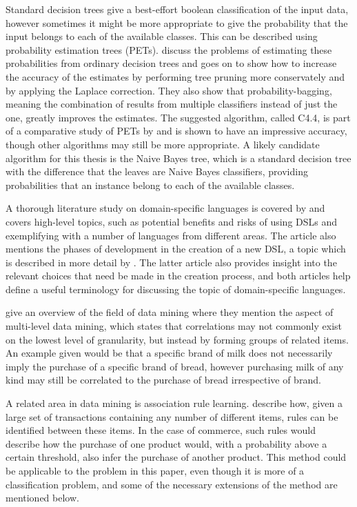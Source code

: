 \documentclass[a4paper]{article}
\begin{document}
Standard decision trees give a best-effort boolean classification of the input data, however sometimes it might be more appropriate to give the probability that the input belongs to each of the available classes. This can be described using probability estimation trees (PETs). \citet{Provost2003} discuss the problems of estimating these probabilities from ordinary decision trees and goes on to show how to increase the accuracy of the estimates by performing tree pruning more conservately and by applying the Laplace correction.  They also show that probability-bagging, meaning the combination of results from multiple classifiers instead of just the one, greatly improves the estimates. The suggested algorithm, called C4.4, is part of a comparative study of PETs by \citet{Chu2011} and is shown to have an impressive accuracy, though other algorithms may still be more appropriate. A likely candidate algorithm for this thesis is the Naive Bayes tree, which is a standard decision tree with the difference that the leaves are Naive Bayes classifiers, providing probabilities that an instance belong to each of the available classes.

A thorough literature study on domain-specific languages is covered by \citet{Deursen2000} and covers high-level topics, such as potential benefits and risks of using DSLs and exemplifying with a number of languages from different areas. The article also mentions the phases of development in the creation of a new DSL, a topic which is described in more detail by \citet{Mernik2005}. The latter article also provides insight into the relevant choices that need be made in the creation process, and both articles help define a useful terminology for discussing the topic of domain-specific languages.

\citet{Chen1996} give an overview of the field of data mining where they mention the aspect of multi-level data mining, which states that correlations may not commonly exist on the lowest level of granularity, but instead by forming groups of related items. An example given would be that a specific brand of milk does not necessarily imply the purchase of a specific brand of bread, however purchasing milk of any kind may still be correlated to the purchase of bread irrespective of brand.

A related area in data mining is association rule learning. \citet{Agrawal1993} describe how, given a large set of transactions containing any number of different items, rules can be identified between these items. In the case of commerce, such rules would describe how the purchase of one product would, with a probability above a certain threshold, also infer the purchase of another product. This method could be applicable to the problem in this paper, even though it is more of a classification problem, and some of the necessary extensions of the method are mentioned below.
\end{document}
